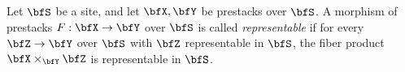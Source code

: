     \begin{definition}\label{def:representable_of_morphisms_between_stacks}
        Let \(\bfS\) be a site, and let \(\bfX, \bfY\) be prestacks over \(\bfS\).
        A morphism of prestacks \(F: \bfX \to \bfY\) over \(\bfS\) is called \emph{representable} if for every \(\bfZ \to \bfY\) over \(\bfS\) with \(\bfZ\) representable in \(\bfS\),
        the fiber product \(\bfX \times_{\bfY} \bfZ\) is representable in \(\bfS\).
    \end{definition}


